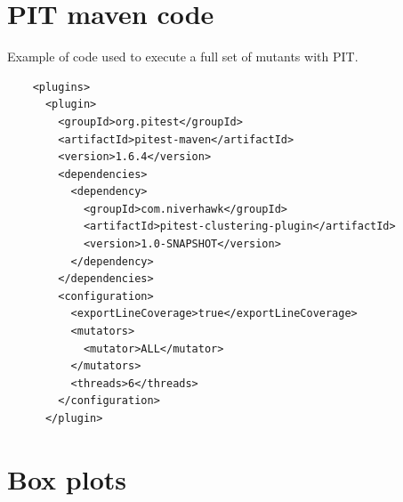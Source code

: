 \begin{appendices}
	
\chapter{PIT maven code}
\label{ap:PIT_maven_code}
Example of code used to execute a full set of mutants with PIT.
\begin{lstlisting}
    <plugins>
      <plugin>
        <groupId>org.pitest</groupId>
        <artifactId>pitest-maven</artifactId>
        <version>1.6.4</version>
        <dependencies>
          <dependency>
            <groupId>com.niverhawk</groupId>
            <artifactId>pitest-clustering-plugin</artifactId>
            <version>1.0-SNAPSHOT</version>
          </dependency>
        </dependencies>
        <configuration>
          <exportLineCoverage>true</exportLineCoverage>
          <mutators>
            <mutator>ALL</mutator>
          </mutators>
          <threads>6</threads>
        </configuration>
      </plugin>
\end{lstlisting}

\chapter{Box plots}

\end{appendices}
